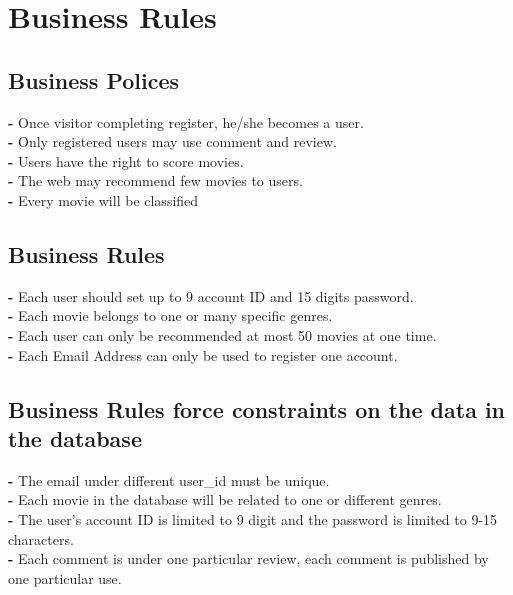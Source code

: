 \documentclass[12pt]{article}
\begin{document}
\section{Business Rules}
\subsection{Business Polices}
\textbf{-}	Once visitor completing register, he/she becomes a user.\\
\textbf{-}	Only registered users may use comment and review.\\
\textbf{-}	Users have the right to score movies.\\
\textbf{-}	The web may recommend few movies to users.\\
\textbf{-}	Every movie will be classified\\

\subsection{Business Rules}
\textbf{-}	Each user should set up to 9 account ID and 15 digits password.\\
\textbf{-}	Each movie belongs to one or many specific genres.\\
\textbf{-}  Each user can only be recommended at most 50 movies at one time.\\
\textbf{-}  Each Email Address can only be used to register one account.\\

\subsection{Business Rules force constraints on the data in the database}
\textbf{-}  The email under different user\_id must be unique.\\
\textbf{-}	Each movie in the database will be related to one or different genres.\\
\textbf{-}	The user’s account ID is limited to 9 digit and the password is limited to 9-15 characters.\\
\textbf{-}	Each comment is under one particular review, each comment is published by one particular use.\\
\end{document}
